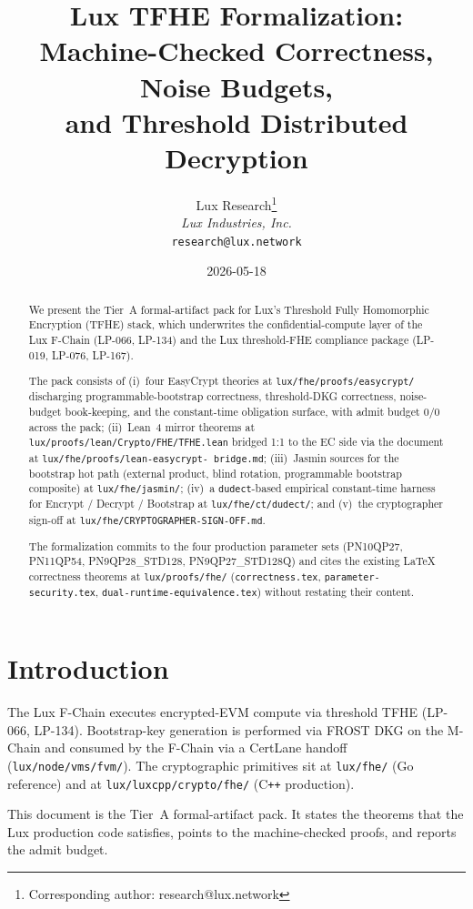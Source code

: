 \documentclass[11pt,a4paper]{article}
\title{\textbf{Lux TFHE Formalization:\\Machine-Checked Correctness, Noise Budgets,\\and Threshold Distributed Decryption}}
\author{
Lux Research\thanks{Corresponding author: research@lux.network}\\
\textit{Lux Industries, Inc.}\\
\texttt{research@lux.network}
}
\date{2026-05-18}
\begin{document}
\maketitle

\begin{abstract}
We present the Tier~A formal-artifact pack for Lux's Threshold
Fully Homomorphic Encryption (TFHE) stack, which underwrites the
confidential-compute layer of the Lux F-Chain (LP-066, LP-134) and
the Lux threshold-FHE compliance package (LP-019, LP-076, LP-167).

The pack consists of (i)~four EasyCrypt theories at
\texttt{lux/fhe/proofs/easycrypt/} discharging programmable-bootstrap
correctness, threshold-DKG correctness, noise-budget book-keeping,
and the constant-time obligation surface, with admit budget
$0/0$ across the pack; (ii)~Lean~4 mirror theorems at
\texttt{lux/proofs/lean/Crypto/FHE/TFHE.lean} bridged 1:1 to the EC
side via the document at \texttt{lux/fhe/proofs/lean-easycrypt-
bridge.md}; (iii)~Jasmin sources for the bootstrap hot path
(external product, blind rotation, programmable bootstrap composite)
at \texttt{lux/fhe/jasmin/}; (iv)~a \texttt{dudect}-based empirical
constant-time harness for Encrypt / Decrypt / Bootstrap at
\texttt{lux/fhe/ct/dudect/}; and (v)~the cryptographer sign-off at
\texttt{lux/fhe/CRYPTOGRAPHER-SIGN-OFF.md}.

The formalization commits to the four production parameter sets
(\textsf{PN10QP27}, \textsf{PN11QP54}, \textsf{PN9QP28\_STD128},
\textsf{PN9QP27\_STD128Q}) and cites the existing LaTeX correctness
theorems at \texttt{lux/proofs/fhe/}
(\texttt{correctness.tex}, \texttt{parameter-security.tex},
\texttt{dual-runtime-equivalence.tex}) without restating their
content.
\end{abstract}

\tableofcontents

\section{Introduction}

The Lux F-Chain executes encrypted-EVM compute via threshold TFHE
(LP-066, LP-134). Bootstrap-key generation is performed via FROST
DKG on the M-Chain and consumed by the F-Chain via a CertLane
handoff (\texttt{lux/node/vms/fvm/}). The cryptographic
primitives sit at \texttt{lux/fhe/} (Go reference) and at
\texttt{lux/luxcpp/crypto/fhe/} (C\texttt{++} production).

This document is the Tier~A formal-artifact pack. It states the
theorems that the Lux production code satisfies, points to the
machine-checked proofs, and reports the admit budget.
\end{document}
